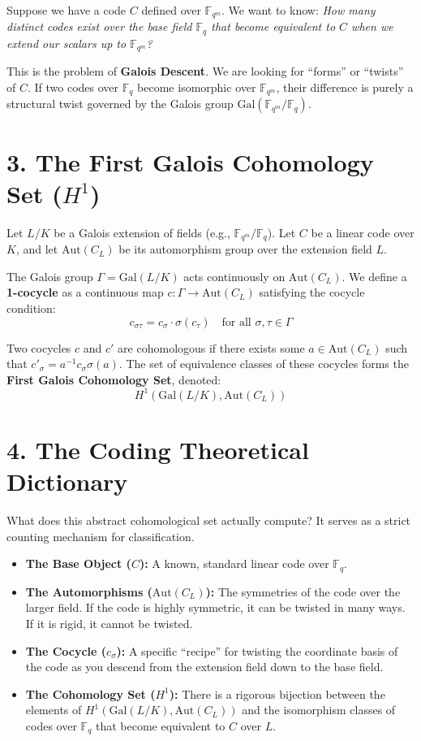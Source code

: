 \documentclass[11pt, a4paper, twoside]{article}
\newcommand{\F}{\mathbb{F}}
\newcommand{\Aut}{\text{Aut}}
\newcommand{\Gal}{\text{Gal}}
\begin{document}
	Suppose we have a code $C$ defined over $\F_{q^m}$. We want to know: \textit{How many distinct codes exist over the base field $\F_q$ that become equivalent to $C$ when we extend our scalars up to $\F_{q^m}$?}
	
	
	
	This is the problem of \textbf{Galois Descent}. We are looking for ``forms'' or ``twists'' of $C$. If two codes over $\F_q$ become isomorphic over $\F_{q^m}$, their difference is purely a structural twist governed by the Galois group $\Gal(\F_{q^m} / \F_q)$.
	
	\section*{3. The First Galois Cohomology Set ($H^1$)}
	
	\begin{theorybox}
		Let $L/K$ be a Galois extension of fields (e.g., $\F_{q^m} / \F_q$). Let $C$ be a linear code over $K$, and let $\Aut(C_L)$ be its automorphism group over the extension field $L$.
		
		The Galois group $\Gamma = \Gal(L/K)$ acts continuously on $\Aut(C_L)$. We define a \textbf{1-cocycle} as a continuous map $c: \Gamma \to \Aut(C_L)$ satisfying the cocycle condition:
		$$ c_{\sigma \tau} = c_\sigma \cdot \sigma(c_\tau) \quad \text{for all } \sigma, \tau \in \Gamma $$
		
		Two cocycles $c$ and $c'$ are cohomologous if there exists some $a \in \Aut(C_L)$ such that $c'_\sigma = a^{-1} c_\sigma \sigma(a)$. 
		The set of equivalence classes of these cocycles forms the \textbf{First Galois Cohomology Set}, denoted:
		$$ H^1(\Gal(L/K), \Aut(C_L)) $$
	\end{theorybox}
	
	\section*{4. The Coding Theoretical Dictionary}
	
	What does this abstract cohomological set actually compute? It serves as a strict counting mechanism for classification.
	
	\begin{itemize}
		\item \textbf{The Base Object ($C$):} A known, standard linear code over $\F_q$.
		\item \textbf{The Automorphisms ($\Aut(C_L)$):} The symmetries of the code over the larger field. If the code is highly symmetric, it can be twisted in many ways. If it is rigid, it cannot be twisted.
		\item \textbf{The Cocycle ($c_\sigma$):} A specific ``recipe'' for twisting the coordinate basis of the code as you descend from the extension field down to the base field.
		\item \textbf{The Cohomology Set ($H^1$):} There is a rigorous bijection between the elements of $H^1(\Gal(L/K), \Aut(C_L))$ and the isomorphism classes of codes over $\F_q$ that become equivalent to $C$ over $L$.
	\end{itemize}
	
\end{document}
